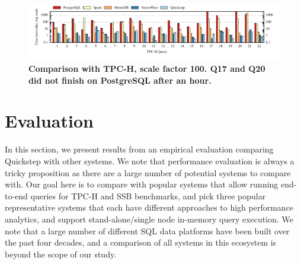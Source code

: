 
\begin{figure}[htb]
\center
\includegraphics[]{system/figures/all-tpch-sf100.pdf}
\caption{\textbf{Comparison with TPC-H, scale factor 100. Q17 and Q20 did not finish on PostgreSQL after an hour.}} %
\label{fig-tpch-sf100}
\end{figure}

\section{Evaluation} \label{evaluation}
In this section, we present results from an empirical evaluation comparing Quickstep with other systems. We note that performance evaluation is always a tricky proposition as there are a large number of potential systems to compare with. Our goal here is to compare with popular systems that allow running end-to-end queries for TPC-H and SSB benchmarks, and pick three popular representative systems that each have different approaches to high performance analytics, and support stand-alone/single node in-memory query execution. We note that a large number of different SQL data platforms have been built over the past four decades, and a comparison of all systems in this ecosystem is beyond the scope of our study.


